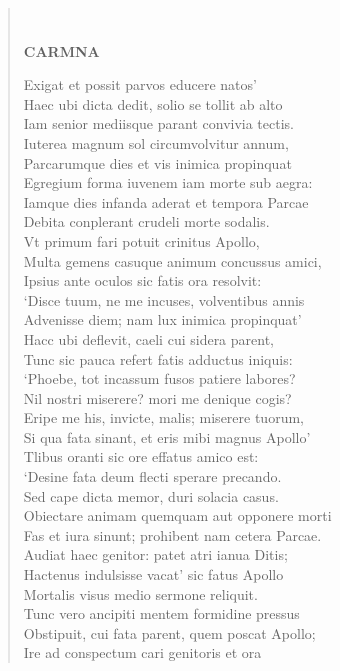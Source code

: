 \documentclass[11pt, a4paper]{report}
\begin{document}
\begin{verse}
        ﻿\pagebreak 
    \begin{center} \textbf{CARMNA} \end{center}Exigat et possit parvos educere natos’ \\ Haec ubi dicta dedit, solio se tollit ab alto \\ Iam senior mediisque parant convivia tectis. \\ Iuterea magnum sol circumvolvitur annum, \\ Parcarumque dies et vis inimica propinquat \\ Egregium forma iuvenem iam morte sub aegra: \\ Iamque dies infanda aderat et tempora Parcae \\ Debita conplerant crudeli morte sodalis. \\ Vt primum fari potuit crinitus Apollo, \\ Multa gemens casuque animum concussus amici, \\ Ipsius ante oculos sic fatis ora resolvit: \\ ‘Disce tuum, ne me incuses, volventibus annis \\ Advenisse diem; nam lux inimica propinquat’ \\ Hacc ubi deflevit, caeli cui sidera parent, \\ Tunc sic pauca refert fatis adductus iniquis: \\ ‘Phoebe, tot incassum fusos patiere labores? \\ Nil nostri miserere? mori me denique cogis? \\ Eripe me his, invicte, malis; miserere tuorum, \\ Si qua fata sinant, et eris mibi magnus Apollo’ \\ Tlibus oranti sic ore effatus amico est: \\ ‘Desine fata deum flecti sperare precando. \\ Sed cape dicta memor, duri solacia casus. \\ Obiectare animam quemquam aut opponere morti \\ Fas et iura sinunt; prohibent nam cetera Parcae. \\ Audiat haec genitor: patet atri ianua Ditis; \\ Hactenus indulsisse vacat’ sic fatus Apollo \\ Mortalis visus medio sermone reliquit. \\ Tunc vero ancipiti mentem formidine pressus \\ Obstipuit, cui fata parent, quem poscat Apollo; \\ Ire ad conspectum cari genitoris et ora \\ 

\end{verse}
\end{document}
